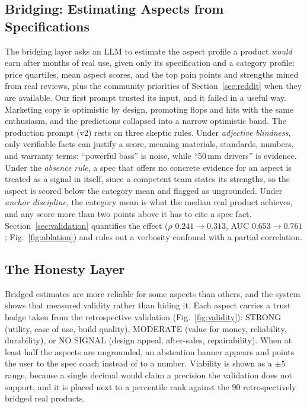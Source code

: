 \documentclass[journal]{IEEEtran}
\begin{document}
\subsection{Bridging: Estimating Aspects from Specifications}
The bridging layer asks an LLM to estimate the aspect profile a product \emph{would} earn after months of real use, given only its specification and a category profile: price quartiles, mean aspect scores, and the top pain points and strengths mined from real reviews, plus the community priorities of Section~\ref{sec:reddit} when they are available. Our first prompt trusted its input, and it failed in a useful way. Marketing copy is optimistic by design, promoting flops and hits with the same enthusiasm, and the predictions collapsed into a narrow optimistic band. The production prompt (v2) rests on three skeptic rules. Under \emph{adjective blindness}, only verifiable facts can justify a score, meaning materials, standards, numbers, and warranty terms: ``powerful bass'' is noise, while ``50\,mm drivers'' is evidence. Under the \emph{absence rule}, a spec that offers no concrete evidence for an aspect is treated as a signal in itself, since a competent team states its strengths, so the aspect is scored below the category mean and flagged as ungrounded. Under \emph{anchor discipline}, the category mean is what the median real product achieves, and any score more than two points above it has to cite a spec fact. Section~\ref{sec:validation} quantifies the effect ($\rho$ $0.241 \to 0.313$, AUC $0.653 \to 0.761$; Fig.~\ref{fig:ablation}) and rules out a verbosity confound with a partial correlation.

\subsection{The Honesty Layer}
Bridged estimates are more reliable for some aspects than others, and the system shows that measured validity rather than hiding it. Each aspect carries a trust badge taken from the retrospective validation (Fig.~\ref{fig:validity}): STRONG (utility, ease of use, build quality), MODERATE (value for money, reliability, durability), or NO SIGNAL (design appeal, after-sales, repairability). When at least half the aspects are ungrounded, an abstention banner appears and points the user to the spec coach instead of to a number. Viability is shown as a $\pm 5$ range, because a single decimal would claim a precision the validation does not support, and it is placed next to a percentile rank against the 90 retrospectively bridged real products.
\end{document}
